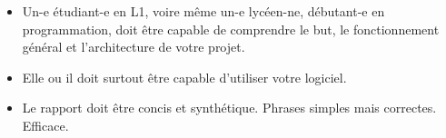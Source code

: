 \documentclass[a4paper,12pt]{article}
\begin{document}
\begin{itemize}
\item[$\ast$] Un-e étudiant-e en L1, voire même un-e lycéen-ne, débutant-e en programmation,
doit être capable de comprendre le but, le fonctionnement général et l'architecture de 
votre projet.
\item[$\ast$] Elle ou il doit surtout être capable d'utiliser votre logiciel.
\item[$\ast$] Le rapport doit être concis et synthétique. Phrases simples mais correctes. Efficace.
\end{itemize}
\end{document}
